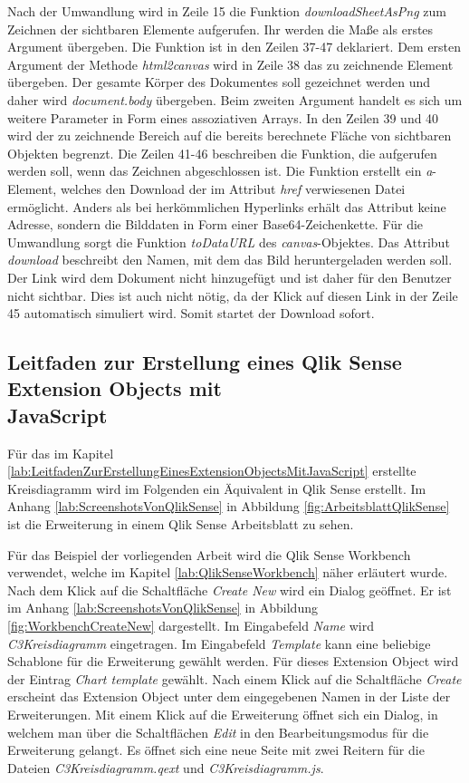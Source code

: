 Nach der Umwandlung wird in Zeile 15 die Funktion \textit{downloadSheetAsPng} zum Zeichnen der sichtbaren Elemente aufgerufen. Ihr werden die Maße als erstes Argument übergeben. Die Funktion ist in den Zeilen 37-47 deklariert. Dem ersten Argument der Methode \textit{html2canvas} wird in Zeile 38 das zu zeichnende Element übergeben. Der gesamte Körper des Dokumentes soll gezeichnet werden und daher wird \textit{document.body} übergeben. Beim zweiten Argument handelt es sich um weitere Parameter in Form eines assoziativen Arrays. In den Zeilen 39 und 40 wird der zu zeichnende Bereich auf die bereits berechnete Fläche von sichtbaren Objekten begrenzt. Die Zeilen 41-46 beschreiben die Funktion, die aufgerufen werden soll, wenn das Zeichnen abgeschlossen ist. Die Funktion erstellt ein \textit{a}-Element, welches den Download der im Attribut \textit{href} verwiesenen Datei ermöglicht. Anders als bei herkömmlichen Hyperlinks erhält das Attribut keine Adresse, sondern die Bild\-daten in Form einer Base64-Zeichenkette. Für die Umwandlung sorgt die Funktion \textit{toDataURL} des \textit{canvas}-Objektes. Das Attribut \textit{download} beschreibt den Namen, mit dem das Bild heruntergeladen werden soll. Der Link wird dem Dokument nicht hinzugefügt und ist daher für den Benutzer nicht sichtbar. Dies ist auch nicht nötig, da der Klick auf diesen Link in der Zeile 45 automatisch simuliert wird. Somit startet der Download sofort.

\subsection{Leitfaden zur Erstellung eines Qlik Sense Extension Objects mit \\JavaScript}
\label{lab:LeitfadenZurErstellungEinesQlikSenseExtensionObjectsMitJavaScript} 

Für das im Kapitel \ref{lab:LeitfadenZurErstellungEinesExtensionObjectsMitJavaScript} erstellte Kreisdiagramm wird im Folgenden ein Äquivalent in Qlik Sense erstellt. Im Anhang \ref{lab:ScreenshotsVonQlikSense} in Abbildung \ref{fig:ArbeitsblattQlikSense} ist die Erweiterung in einem Qlik Sense Arbeitsblatt zu sehen.

Für das Beispiel der vorliegenden Arbeit wird die Qlik Sense Workbench verwendet, welche im Kapitel \ref{lab:QlikSenseWorkbench} näher erläutert wurde. Nach dem Klick auf die Schaltfläche \textit{Create New} wird ein Dialog geöffnet. Er ist im Anhang \ref{lab:ScreenshotsVonQlikSense} in Abbildung \ref{fig:WorkbenchCreateNew} dargestellt. Im Eingabefeld \textit{Name} wird \textit{C3Kreisdiagramm} eingetragen. Im Eingabefeld \textit{Template} kann eine beliebige Schablone für die Erweiterung gewählt werden. Für dieses Extension Object wird der Eintrag \textit{Chart template} gewählt. Nach einem Klick auf die Schaltfläche \textit{Create} erscheint das Extension Object unter dem eingegebenen Namen in der Liste der Erweiterungen. Mit einem Klick auf die Erweiterung öffnet sich ein Dialog, in welchem man über die Schaltflächen \textit{Edit} in den Bearbeitungsmodus für die Erweiterung gelangt. Es öffnet sich eine neue Seite mit zwei Reitern für die Dateien \textit{C3Kreisdiagramm.qext} und \textit{C3Kreisdiagramm.js}.

